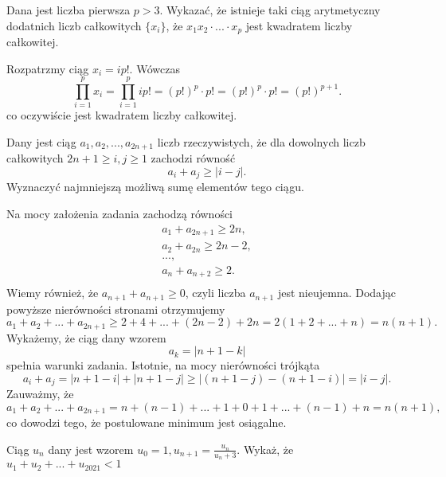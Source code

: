 \newpage
{}

\begin{problem}{1}
	Dana jest liczba pierwsza $p>3$. Wykazać, że istnieje taki ciąg arytmetyczny dodatnich liczb całkowitych $\{x_i\}$, że $x_1x_2\cdot ... \cdot x_p$ jest kwadratem liczby całkowitej.
\end{problem}

\noindent 
Rozpatrzmy ciąg $x_i=ip!$.
Wówczas
\[
	\prod_{i=1}^p x_i=\prod_{i=1}^p ip!=(p!)^{p}\cdot p! = (p!)^{p}\cdot p!=(p!)^{p+1}.
\]
co oczywiście jest kwadratem liczby całkowitej.
\\


\begin{problem}{2}
	Dany jest ciąg $a_1, a_2, ..., a_{2n + 1}$ liczb rzeczywistych, że dla dowolnych liczb całkowitych $2n + 1 \geqslant i, j \geqslant 1$ zachodzi równość
	\[
		a_i + a_j \geqslant |i - j|.
	\]
	Wyznaczyć najmniejszą możliwą sumę elementów tego ciągu.
\end{problem}


\noindent
Na mocy założenia zadania zachodzą równości
\begin{align*}
	a_1 + a_{2n + 1} \geqslant 2n, \\
	a_2 + a_{2n} \geqslant 2n - 2, \\
	..., \\
	a_n + a_{n + 2} \geqslant 2. \\
\end{align*}
Wiemy również, że $a_{n + 1} + a_{n + 1} \geqslant 0$, czyli liczba $a_{n + 1}$ jest nieujemna. Dodając powyższe nierówności stronami otrzymujemy
\[
	a_1 + a_2 + ... + a_{2n + 1} \geqslant 2 + 4 + ... + (2n - 2) + 2n = 2(1 + 2 + ... + n) = n(n + 1).
\]
Wykażemy, że ciąg dany wzorem
\[
	a_k = |n + 1 - k|
\]
spełnia warunki zadania. Istotnie, na mocy nierówności trójkąta
\[
	a_i + a_j = |n + 1 - i| + |n + 1 - j| \geqslant |(n + 1 - j) - (n + 1 - i)| = |i - j|.
\]
Zauważmy, że
\[
	a_1 + a_2 + ... + a_{2n + 1} = n + (n - 1) + ... + 1 + 0 + 1 + ... + (n - 1) + n = n(n + 1),
\]
co dowodzi tego, że postulowane minimum jest osiągalne.


\begin{problem}{3}
	Ciąg ${u_n}$ dany jest wzorem $u_0=1, u_{n+1}=\frac{u_n}{u_n+3}$. Wykaż, że $ u_1+u_2+...+u_{2021}<1$
\end{problem}

